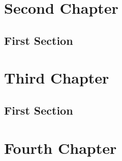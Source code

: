 \documentclass{report}
\begin{document}
\chapter{Second Chapter}
\section{First Section}
\chapter{Third Chapter}
\section{First Section}
\chapter{Fourth Chapter}
\end{document}
